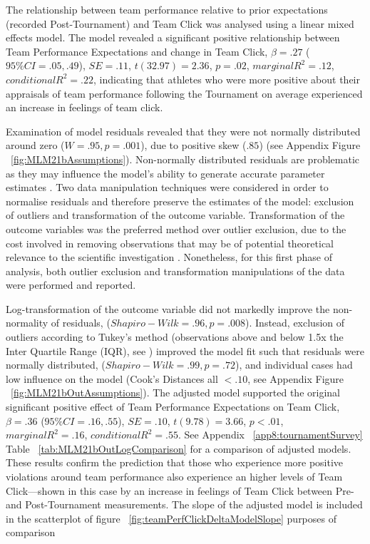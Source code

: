 \begin{CJK}{UTF8}{gbsn}
The relationship between team performance relative to prior expectations (recorded Post-Tournament) and Team Click was analysed using a linear mixed effects model. The model revealed a significant positive relationship between Team Performance Expectations and change in Team Click,  $\beta = .27$ ($95\% CI =  .05, .49$), $SE = .11$, $t(32.97) = 2.36$, $p = .02$, $marginal R^2 = .12$, $conditional R^2 = .22$, indicating that athletes who were more positive about their appraisals of team performance following the Tournament on average experienced an increase in feelings of team click.

Examination of model residuals revealed that they were not normally distributed around zero ($W = .95, p = .001$), due to positive skew ($.85$) (see Appendix Figure ~\ref{fig:MLM21bAssumptions}).  Non-normally distributed residuals are problematic as they may influence the model's ability to generate accurate parameter estimates . Two data manipulation techniques were considered in order to normalise residuals and therefore preserve the estimates of the model: exclusion of outliers and transformation of the outcome variable.  Transformation of the outcome variables was the preferred method over outlier exclusion, due to the cost involved in removing observations that may be of potential theoretical relevance to the scientific investigation \citep{Rousseeuw2011}. Nonetheless, for this first phase of analysis, both outlier exclusion and transformation manipulations of the data were performed and reported.

Log-transformation of the outcome variable did not markedly improve the non-normality of residuals, ($Shapiro-Wilk = .96, p = .008$).  Instead, exclusion of outliers according to Tukey's method (observations above and below 1.5x the Inter Quartile Range (IQR), see \citep{Tukey1977}) improved the model fit such that residuals were normally distributed, ($Shapiro-Wilk = .99, p = .72$), and individual cases had low influence on the model (Cook's Distances all $< .10$, see Appendix Figure ~\ref{fig:MLM21bOutAssumptions}).
The adjusted model supported the original significant positive effect of Team Performance Expectations on Team Click, $\beta = .36$ ($95\% CI =  .16, .55$), $SE = .10$, $t(9.78) = 3.66$, $p < .01$, $marginal R^2 = .16$, $conditional R^2 = .55$.
See Appendix ~\ref{app8:tournamentSurvey} Table ~\ref{tab:MLM21bOutLogComparison} for a comparison of adjusted models. These results confirm the prediction that those who experience more positive violations around team performance also experience an higher levels of Team Click---shown in this case by an increase in feelings of Team Click between Pre- and Post-Tournament measurements.  The slope of the adjusted model is included in the scatterplot of figure ~\ref{fig:teamPerfClickDeltaModelSlope} purposes of comparison


\end{CJK}

